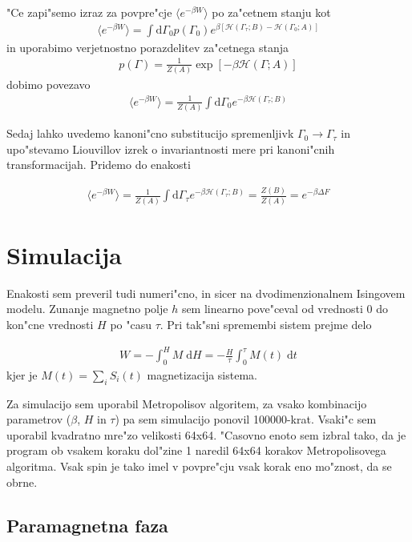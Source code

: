 \documentclass[a4paper,10pt]{article}
\begin{document}
"Ce zapi"semo izraz za povpre"cje $\langle e^{-\beta W}\rangle$ po za"cetnem stanju kot
\begin{align}
 \langle e^{-\beta W}\rangle = \int \mathrm{d}\Gamma_0 p(\Gamma_0) e^{\beta [\mathcal{H}(\Gamma_\tau; B) - \mathcal{H}(\Gamma_0; A)]}
\end{align}
in uporabimo verjetnostno porazdelitev za"cetnega stanja
\begin{align}
 p(\Gamma) = \frac{1}{Z(A)} \exp\left[-\beta \mathcal{H}(\Gamma; A)\right]
\end{align}
dobimo povezavo
\begin{align}
 \langle e^{-\beta W}\rangle = \frac{1}{Z(A)}\int \mathrm{d}\Gamma_0 e^{-\beta\mathcal{H}(\Gamma_\tau; B)} 
\end{align}

Sedaj lahko uvedemo kanoni"cno substitucijo spremenljivk $\Gamma_0 \to \Gamma_\tau$ in upo"stevamo Liouvillov izrek o invariantnosti mere pri kanoni"cnih transformacijah. Pridemo do enakosti

\begin{align}
  \langle e^{-\beta W}\rangle = \frac{1}{Z(A)}\int \mathrm{d}\Gamma_\tau e^{-\beta\mathcal{H}(\Gamma_\tau; B)} = \frac{Z(B)}{Z(A)} = e^{-\beta \Delta F}
\end{align}

\section{Simulacija}

Enakosti sem preveril tudi numeri"cno, in sicer na dvodimenzionalnem Isingovem modelu. Zunanje magnetno polje $h$ sem linearno pove"ceval od vrednosti 0 do kon"cne vrednosti $H$ po "casu $\tau$. Pri tak"sni spremembi sistem prejme delo

\begin{align}
 W = -\int_0^H M \;\mathrm{d}H = -\frac{H}{\tau} \int_0^\tau M(t) \; \mathrm{d}t
\end{align}
kjer je $M(t) = \sum_i S_i(t)$ magnetizacija sistema. 

Za simulacijo sem uporabil Metropolisov algoritem, za vsako kombinacijo parametrov ($\beta$, $H$ in $\tau$) pa sem simulacijo ponovil 100000-krat. Vsaki"c sem uporabil kvadratno mre"zo velikosti 64x64. "Casovno enoto sem izbral tako, da je program ob vsakem koraku dol"zine 1 naredil 64x64 korakov Metropolisovega algoritma. Vsak spin je tako imel v povpre"cju vsak korak eno mo"znost, da se obrne. 

\subsection{Paramagnetna faza}
\end{document}
